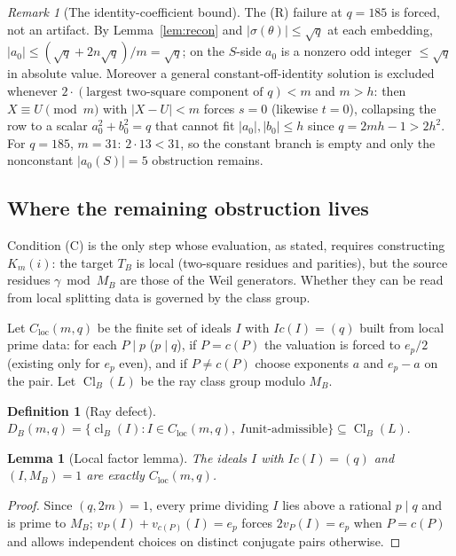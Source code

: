 \documentclass[11pt]{article}
\theoremstyle{plain}
\newtheorem{lemma}[theorem]{Lemma}
\theoremstyle{definition}
\newtheorem{definition}[theorem]{Definition}
\theoremstyle{remark}
\newtheorem{remark}[theorem]{Remark}
\newcommand{\Cl}{\operatorname{Cl}}
\begin{document}
\begin{remark}[The identity-coefficient bound]\label{rem:box}
The (R) failure at $q=185$ is forced, not an artifact. By Lemma~\ref{lem:recon}
and $|\sigma(\theta)|\le\sqrt q$ at each embedding, $|a_0|\le(\sqrt q+2n\sqrt
q)/m=\sqrt q$; on the $S$-side $a_0$ is a nonzero odd integer $\le\sqrt q$ in
absolute value. Moreover a general constant-off-identity solution is excluded
whenever $2\cdot(\text{largest two-square component of }q)<m$ and $m>h$: then
$X\equiv U\pmod m$ with $|X-U|<m$ forces $s=0$ (likewise $t=0$), collapsing the
row to a scalar $a_0^2+b_0^2=q$ that cannot fit $|a_0|,|b_0|\le h$ since
$q=2mh-1>2h^2$. For $q=185$, $m=31$: $2\cdot13<31$, so the constant branch is
empty and only the nonconstant $|a_0(S)|=5$ obstruction remains.
\end{remark}

\subsection{Where the remaining obstruction lives}\label{sec:defect}

Condition (C) is the only step whose evaluation, as stated, requires
constructing $K_m(i)$: the target $T_B$ is local (two-square residues and
parities), but the source residues $\gamma\bmod M_B$ are those of the Weil
generators. Whether they can be read from local splitting data is governed by
the class group.

Let $C_{\mathrm{loc}}(m,q)$ be the finite set of ideals $I$ with $Ic(I)=(q)$
built from local prime data: for each $P\mid p$ ($p\mid q$), if $P=c(P)$ the
valuation is forced to $e_p/2$ (existing only for $e_p$ even), and if $P\ne c(P)$
choose exponents $a$ and $e_p-a$ on the pair. Let $\Cl_B(L)$ be the ray class
group modulo $M_B$.

\begin{definition}[Ray defect]\label{def:defect}
$D_B(m,q)=\{\operatorname{cl}_B(I):I\in C_{\mathrm{loc}}(m,q),\ I\text{
unit-admissible}\}\subseteq\Cl_B(L)$.
\end{definition}

\begin{lemma}[Local factor lemma]\label{lem:localfactor}
The ideals $I$ with $Ic(I)=(q)$ and $(I,M_B)=1$ are exactly
$C_{\mathrm{loc}}(m,q)$.
\end{lemma}

\begin{proof}
Since $(q,2m)=1$, every prime dividing $I$ lies above a rational $p\mid q$ and is
prime to $M_B$; $v_P(I)+v_{c(P)}(I)=e_p$ forces $2v_P(I)=e_p$ when $P=c(P)$ and
allows independent choices on distinct conjugate pairs otherwise.
\end{proof}
\end{document}
